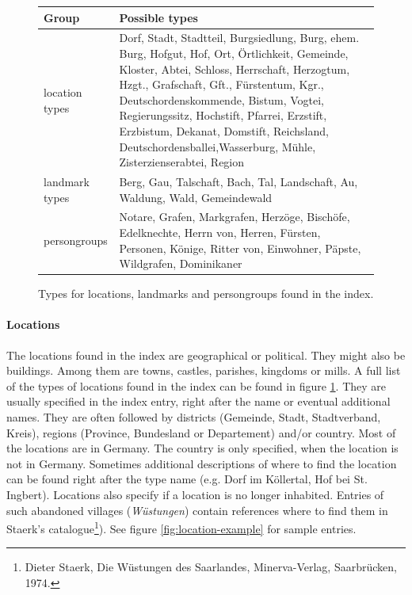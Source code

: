 \begin{figure}[h]
\begin{tabular}{|l|p{9cm}|}
\hline
\textbf{Group}        & \textbf{Possible types}  \\
\hline
location types & Dorf, Stadt, Stadtteil, Burgsiedlung, Burg,  ehem. Burg, Hofgut, Hof, Ort, Örtlichkeit, Gemeinde, Kloster,   Abtei, Schloss, Herrschaft, Herzogtum, Hzgt., Grafschaft,    Gft., Fürstentum, Kgr., Deutschordenskommende, Bistum,     Vogtei, Regierungssitz, Hochstift, Pfarrei, Erzstift, Erzbistum, Dekanat, Domstift, Reichsland, Deutschordensballei,Wasserburg, Mühle, Zisterzienserabtei, Region \\
\hline
landmark types & Berg, Gau, Talschaft, Bach, Tal, Landschaft, Au, Waldung, Wald, Gemeindewald \\
\hline
persongroups   & Notare, Grafen, Markgrafen, Herzöge, Bischöfe, Edelknechte, Herrn von, Herren, Fürsten, Personen, Könige, Ritter von, Einwohner, Päpste, Wildgrafen, Dominikaner \\

\hline
\end{tabular} 
\caption{Types for locations, landmarks and persongroups found in the index.}
\label{fig:location-list}
\end{figure}

\paragraph{Locations}
The locations found in the index are geographical or political. They might also be buildings. Among them are towns, castles, parishes, kingdoms or mills. A full list of the types of locations found in the index can be found in figure \ref{fig:location-list}. They are usually specified in the index entry, right after the name or eventual additional names. They are often followed by districts (Gemeinde, Stadt, Stadtverband, Kreis), regions (Province, Bundesland or Departement) and/or country. Most of the locations are in Germany. The country is only specified, when the location is not in Germany. Sometimes additional descriptions of where to find the location can be found right after the type name (e.g. Dorf im Köllertal, Hof bei St. Ingbert). Locations also specify if a location is no longer inhabited. Entries of such abandoned villages (\textit{Wüstungen}) contain references where to find them in Staerk's catalogue\footnote{Dieter Staerk, Die Wüstungen des Saarlandes, Minerva-Verlag, Saarbrücken, 1974.}). See figure \ref{fig:location-example} for sample entries.

